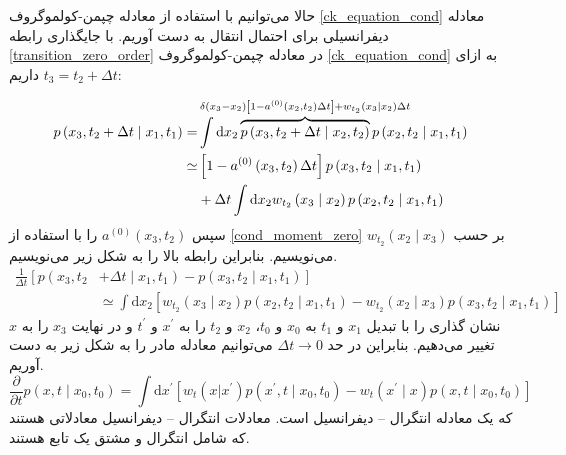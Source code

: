 حالا می‌توانیم با استفاده از معادله چپمن-کولموگروف \ref{ck_equation_cond} معادله دیفرانسیلی برای احتمال انتقال به دست آوریم. با جایگذاری رابطه \ref{transition_zero_order} در معادله چپمن-کولموگروف \ref{ck_equation_cond} به ازای $t_{3} = t_{2} + \Delta t$ داریم:

$$
\begin{aligned} p\left(x_{3}, t_{2}+\Delta t  \mid  x_{1}, t_{1}\right)=& \int \mathrm{d} x_{2} \overbrace{p\left(x_{3}, t_{2}+\Delta t \mid x_{2}, t_{2}\right)}^{\hidewidth \delta\left(x_{3}-x_{2}\right)\left[1-a^{(0)}\left(x_{2}, t_{2}\right) \Delta t\right]+w_{t_{2}}\left(x_{3}  \mid  x_{2}\right) \Delta t \hidewidth } p\left( x_{2}, t_{2} \mid x_{1} , t_{1} \right)\\ \simeq &\left[1-a^{(0)}\left(x_{3}, t_{2}\right) \Delta t\right] p\left(x_{3}, t_{2}  \mid  x_{1}, t_{1}\right) \\ &+\Delta t \int \mathrm{d} x_{2} w_{t_{2}}\left(x_{3}  \mid  x_{2}\right) p\left(x_{2}, t_{2}  \mid  x_{1}, t_{1}\right) \end{aligned}
$$
 سپس  $a^{(0)}\left(x_{3}, t_{2}\right)$ را با استفاده از \ref{cond_moment_zero} بر حسب $w_{t_{2}}(x_{2} \mid x_{3})$ می‌نویسیم. بنابراین رابطه بالا را به شکل زیر می‌نویسیم.
$$
\begin{aligned} \frac{1}{\Delta t}\left[p\left(x_{3}, t_{2}\right.\right.&\left.\left.+\Delta t \mid x_{1}, t_{1}\right)-p\left(x_{3}, t_{2} \mid x_{1}, t_{1}\right)\right] \\ & \simeq \int \mathrm{d} x_{2}\left[w_{t_{2}}\left(x_{3} \mid x_{2}\right) p\left(x_{2}, t_{2} \mid x_{1}, t_{1}\right)-w_{t_{2}}\left(x_{2} \mid x_{3}\right) p\left(x_{3}, t_{2} \mid x_{1}, t_{1}\right)\right] \end{aligned}
$$
نشان گذاری  را با تبدیل $x_{1}$ و $t_{1}$ به $x_{0}$ و $t_{0}$، $x_{2}$ و $t_{2}$ را به $x^\prime$ و $t^\prime$   و در نهایت $x_{3}$ را به $x$ تغییر می‌دهیم. بنابراین در حد $\Delta t \rightarrow 0$ می‌توانیم معادله مادر را به شکل زیر به دست آوریم.
\begin{equation}
  \frac{\partial}{\partial t} p\left(x, t \mid x_{0}, t_{0}\right)=\int \mathrm{d} x^{\prime}\left[w_{t}\left(x | x^{\prime}\right) p\left(x^{\prime}, t \mid x_{0}, t_{0}\right)-w_{t}\left(x^{\prime} \mid x\right) p\left(x, t \mid x_{0}, t_{0}\right)\right]
  \label{master_equation_transition}
\end{equation}
که یک معادله انتگرال – دیفرانسیل است. معادلات انتگرال – دیفرانسیل معادلاتی هستند که شامل انتگرال و مشتق یک تابع هستند.

